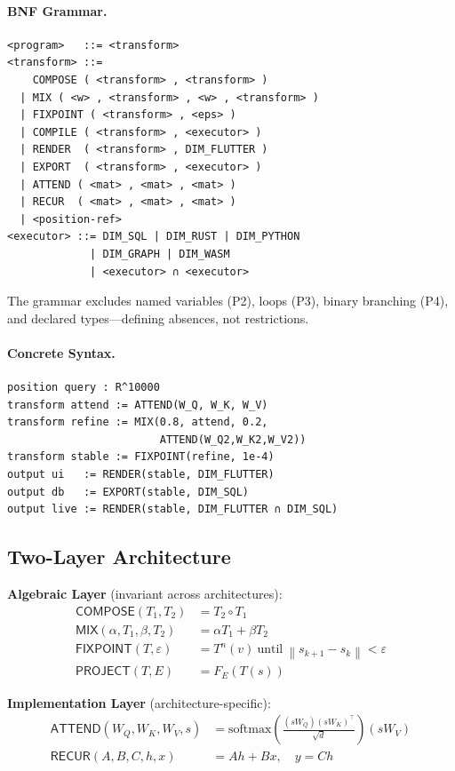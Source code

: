 \documentclass[10pt,twocolumn]{article}
\theoremstyle{plain}
\theoremstyle{definition}
\theoremstyle{remark}
\newcommand{\Compose}{\mathsf{COMPOSE}}
\newcommand{\Mix}{\mathsf{MIX}}
\newcommand{\Fixpoint}{\mathsf{FIXPOINT}}
\newcommand{\Project}{\mathsf{PROJECT}}
\newcommand{\Attend}{\mathsf{ATTEND}}
\newcommand{\Recur}{\mathsf{RECUR}}
\newcommand{\norm}[1]{\left\|#1\right\|}
\begin{document}
\paragraph{BNF Grammar.}
\begin{lstlisting}[language=polydim,caption={Abstract BNF.}]
<program>   ::= <transform>
<transform> ::=
    COMPOSE ( <transform> , <transform> )
  | MIX ( <w> , <transform> , <w> , <transform> )
  | FIXPOINT ( <transform> , <eps> )
  | COMPILE ( <transform> , <executor> )
  | RENDER  ( <transform> , DIM_FLUTTER )
  | EXPORT  ( <transform> , <executor> )
  | ATTEND ( <mat> , <mat> , <mat> )
  | RECUR  ( <mat> , <mat> , <mat> )
  | <position-ref>
<executor> ::= DIM_SQL | DIM_RUST | DIM_PYTHON
             | DIM_GRAPH | DIM_WASM
             | <executor> ∩ <executor>
\end{lstlisting}
The grammar excludes named variables (P2), loops (P3), binary branching (P4),
and declared types---defining absences, not restrictions.

\paragraph{Concrete Syntax.}
\begin{lstlisting}[language=polydim]
position query : R^10000
transform attend := ATTEND(W_Q, W_K, W_V)
transform refine := MIX(0.8, attend, 0.2,
                        ATTEND(W_Q2,W_K2,W_V2))
transform stable := FIXPOINT(refine, 1e-4)
output ui   := RENDER(stable, DIM_FLUTTER)
output db   := EXPORT(stable, DIM_SQL)
output live := RENDER(stable, DIM_FLUTTER ∩ DIM_SQL)
\end{lstlisting}

\subsection{Two-Layer Architecture}

\textbf{Algebraic Layer} (invariant across architectures):
\begin{align*}
\Compose(T_1,T_2)          &= T_2\circ T_1 \\
\Mix(\alpha,T_1,\beta,T_2) &= \alpha T_1+\beta T_2 \\
\Fixpoint(T,\varepsilon)   &= T^n(v)\ \text{until}\ \norm{s_{k+1}-s_k}<\varepsilon \\
\Project(T,E)              &= F_E(T(s))
\end{align*}

\textbf{Implementation Layer} (architecture-specific):
\begin{align*}
\Attend(W_Q,W_K,W_V,s) &= \mathrm{softmax}\!\left(\tfrac{(sW_Q)(sW_K)^\top}{\sqrt{d}}\right)\!(sW_V) \\
\Recur(A,B,C,h,x)      &= Ah{+}Bx,\quad y=Ch
\end{align*}
\end{document}
